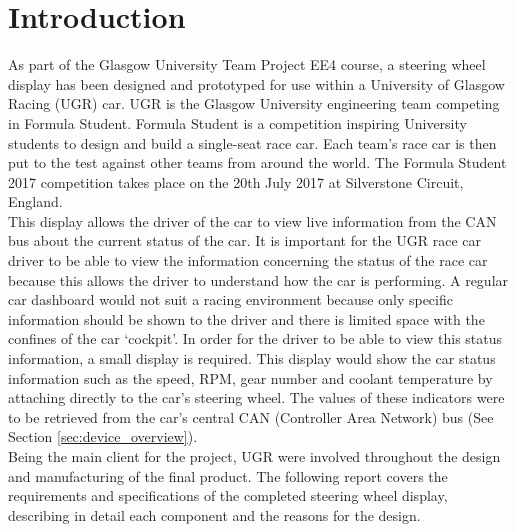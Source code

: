 \documentclass[a4paper,12pt]{article}
\begin{document}

\newpage
\tableofcontents


\newpage
\section{Introduction}
\label{sec:introduction}

As part of the Glasgow University Team Project EE4 course, a steering wheel display has been designed and prototyped for use within a University of Glasgow Racing (UGR) car. UGR is the Glasgow University engineering team competing in Formula Student. Formula Student is a competition inspiring University students to design and build a single-seat race car. Each team’s race car is then put to the test against other teams from around the world. The Formula Student 2017 competition takes place on the 20th July 2017 at Silverstone Circuit, England. \\

This display allows the driver of the car to view live information from the CAN bus about the current status of the car. It is important for the UGR race car driver to be able to view the information concerning the status of the race car because this allows the driver to understand how the car is performing. A regular car dashboard would not suit a racing environment because only specific information should be shown to the driver and there is limited space with the confines of the car `cockpit'. In order for the driver to be able to view this status information, a small display is required. This display would show the car status information such as the speed, RPM, gear number and coolant temperature by attaching directly to the car’s steering wheel. The values of these indicators were to be retrieved from the car's central CAN (Controller Area Network) bus (See Section \ref{sec:device_overview}). \\

Being the main client for the project, UGR were involved throughout the design and manufacturing of the final product. The following report covers the requirements and specifications of the completed steering wheel display, describing in detail each component and the reasons for the design. \\
\end{document}
